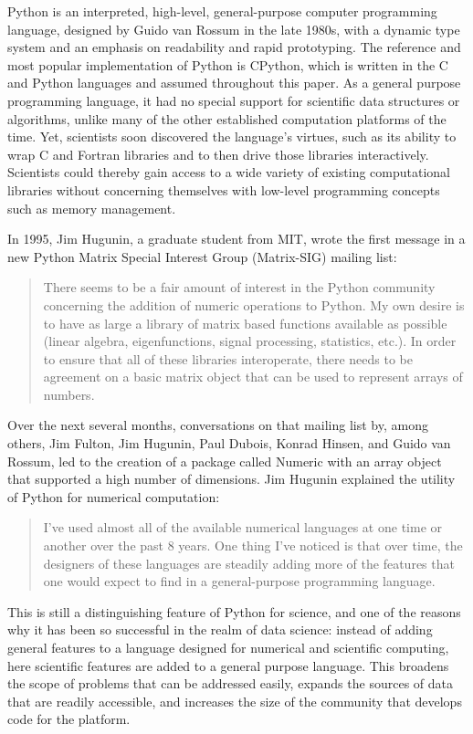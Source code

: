 \documentclass[fleqn,10pt]{wlscirep}
\begin{document}
Python is an interpreted, high-level, general-purpose computer programming
language, designed by Guido van Rossum in the late 1980s,
with a dynamic type system and an emphasis on readability and rapid prototyping.
The reference and most popular implementation of Python is 
CPython\cite{cpython-refman,cpython-source}, which is written
in the C and Python languages and assumed throughout this paper.
%
As a general purpose programming language, it had no special support for 
scientific data structures or algorithms, unlike many of the other established
computation platforms of the time. Yet, scientists soon discovered the
language's virtues, such as its ability to wrap C and Fortran
libraries and to then drive those libraries interactively.  Scientists
could thereby gain access to a wide variety of existing computational
libraries without concerning themselves with low-level programming
concepts such as memory management.

In 1995, Jim Hugunin, a graduate student from MIT, wrote the first
message in a new Python Matrix Special Interest Group (Matrix-SIG)
mailing list\cite{Hugunin-first}:
\begin{quote}
There seems to be a fair amount of interest in the Python community
concerning the addition of numeric operations to Python.  My own desire is
to have as large a library of matrix based functions available as possible
(linear algebra, eigenfunctions, signal processing, statistics, etc.).  In
order to ensure that all of these libraries interoperate, there needs to
be agreement on a basic matrix object that can be used to represent arrays
of numbers.
\end{quote}
Over the next several months, conversations on that mailing
list by, among others, Jim Fulton, Jim Hugunin, Paul Dubois, Konrad
Hinsen, and Guido van Rossum, led to the creation of a package called Numeric with an array object
that supported a high number of dimensions.  Jim Hugunin explained the utility
of Python for numerical computation\cite{Hugunin-whitepaper}:
\begin{quote}
I've used almost all of the available numerical languages at one time
or another over the past 8 years. One thing I've noticed is that over
time, the designers of these languages are steadily adding more of the
features that one would expect to find in a general-purpose
programming language.
\end{quote}
This is still a distinguishing feature of Python for science, and one of the
reasons why it has been so successful in the realm of data science: instead of
adding general features to a language designed for numerical and scientific
computing, here scientific features are added to a general purpose language.  
This broadens the scope of problems that can be addressed easily, expands the
sources of data that are readily accessible, and increases the size of the
community that develops code for the platform.
\end{document}
